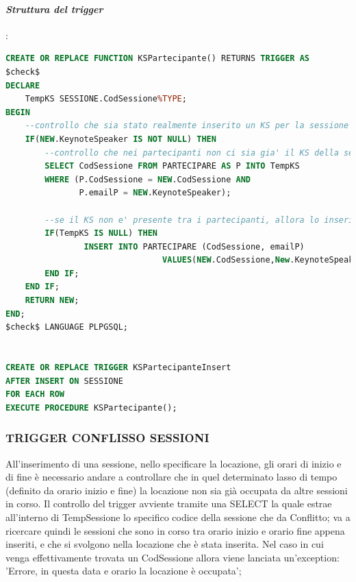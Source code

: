 \documentclass[a4page]{article}
\begin{document}
\paragraph{\textit{Struttura del trigger}}:	
\begin{lstlisting}[language=SQL,
        deletekeywords={IDENTITY,INT},
        morekeywords={clustered},    
        framesep=10pt,
        framextopmargin=10pt]
CREATE OR REPLACE FUNCTION KSPartecipante() RETURNS TRIGGER AS
$check$
DECLARE 
	TempKS SESSIONE.CodSessione%TYPE;
BEGIN
	--controllo che sia stato realmente inserito un KS per la sessione
	IF(NEW.KeynoteSpeaker IS NOT NULL) THEN	
		--controllo che nei partecipanti non ci sia gia' il KS della sessione	
		SELECT CodSessione FROM PARTECIPARE AS P INTO TempKS		 
		WHERE (P.CodSessione = NEW.CodSessione AND				
			   P.emailP = NEW.KeynoteSpeaker);

		--se il KS non e' presente tra i partecipanti, allora lo inserisco
		IF(TempKS IS NULL) THEN								
				INSERT INTO PARTECIPARE (CodSessione, emailP) 	 
								VALUES(NEW.CodSessione,New.KeynoteSpeaker); 
		END IF;
	END IF;
	RETURN NEW;
END;
$check$ LANGUAGE PLPGSQL;


CREATE OR REPLACE TRIGGER KSPartecipanteInsert
AFTER INSERT ON SESSIONE
FOR EACH ROW
EXECUTE PROCEDURE KSPartecipante();        
\end{lstlisting}
\newpage
\subsubsection{TRIGGER CONFLISSO SESSIONI}
All'inserimento di una sessione, nello specificare la locazione, gli orari di inizio e di fine è necessario
andare a controllare che in quel determinato lasso di tempo (definito da orario inizio e fine) la locazione non
sia già occupata da altre sessioni in corso. Il controllo del trigger avviente tramite una SELECT la quale estrae all'interno di TempSessione lo specifico codice della sessione che da Conflitto; va a ricercare quindi le sessioni che sono in corso tra orario inizio e  orario fine appena inseriti, e che si svolgono nella locazione che è stata inserita. Nel caso in cui venga effettivamente trovata un CodSessione allora viene lanciata un'exception:
'Errore, in questa data e orario la locazione è occupata';
\vspace{1cm}
\end{document}
